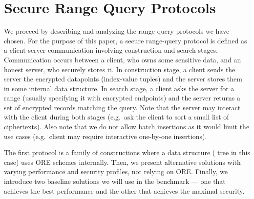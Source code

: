 	
	
	

	

	
	

\section{Secure Range Query Protocols}

	We proceed by describing and analyzing the range query protocols we have chosen.
	For the purpose of this paper, a secure range-query protocol is defined as a client-server communication involving construction and search stages.
	Communication occurs between a client, who owns some sensitive data, and an honest server, who securely stores it.
	In construction stage, a client sends the server the encrypted datapoints (index-value tuples) and the server stores them in some internal data structure.
	In search stage, a client asks the server for a range (usually specifying it with encrypted endpoints) and the server returns a set of encrypted records matching the query.
	Note that the server may interact with the client during both stages (e.g.\ ask the client to sort a small list of ciphertexts).
	Also note that we do not allow batch insertions as it would limit the use cases (e.g.\ client may require interactive one-by-one insertions).

	The first protocol is a family of constructions where a data structure ({\BPlus} tree in this case) uses ORE schemes internally.
	Then, we present alternative solutions with varying performance and security profiles, not relying on ORE\@.
	Finally, we introduce two baseline solutions we will use in the benchmark --- one that achieves the best performance and the other that achieves the maximal security.

	

	

	

	

	

	
